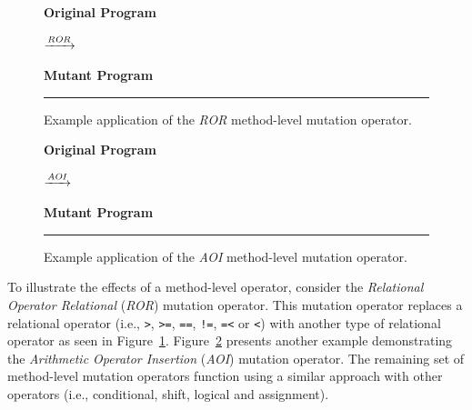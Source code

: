 \begin{figure}[!tb]
  \centering
  \begin{minipage}{6.5cm}
  \centering
  \footnotesize{\textbf{Original Program}}
  
  \end{minipage}
  $\xrightarrow{\emph{ROR}}$
  \begin{minipage}{6.5cm}
  \centering
  \footnotesize{\textbf{Mutant Program}}
  
  \end{minipage}
  \caption{Example application of the \emph{ROR} method-level mutation operator.}
  \vspace{2mm}
  \hrule
  \label{fig:ROR_mutation}
\end{figure}

\begin{figure}[!tb]
  \centering
  \begin{minipage}{6.5cm}
  \centering
  \footnotesize{\textbf{Original Program}}
  
  \end{minipage}
  $\xrightarrow{\emph{AOI}}$
  \begin{minipage}{6.5cm}
  \centering
  \footnotesize{\textbf{Mutant Program}}
  
  \end{minipage}
  \caption{Example application of the \emph{AOI} method-level mutation operator.}
  \vspace{2mm}
  \hrule
  \label{fig:AOI_mutation}
\end{figure}

To illustrate the effects of a method-level operator, consider the \emph{Relational Operator Relational} (\emph{ROR}) mutation operator. This mutation operator replaces a relational operator (i.e., \texttt{>}, \texttt{>=}, \texttt{==}, \texttt{!=}, \texttt{=<} or \texttt{<}) with another type of relational operator as seen in Figure~\ref{fig:ROR_mutation}. Figure~\ref{fig:AOI_mutation} presents another example demonstrating the \emph{Arithmetic Operator Insertion} (\emph{AOI}) mutation operator. The remaining set of method-level mutation operators function using a similar approach with other operators (i.e., conditional, shift, logical and assignment).

